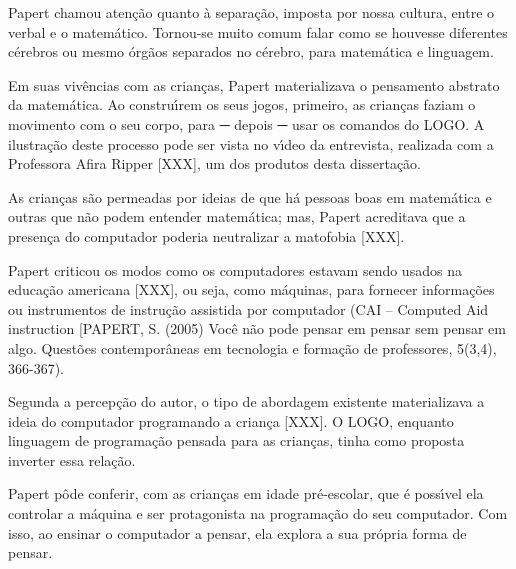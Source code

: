 \documentclass[
12pt,		%
openright,	%
twoside,  %
a4paper,			%
chapter=TITLE,		%
english,			%
french,				%
spanish,			%
brazil				%
]{USPSC-classe/USPSC_RedarTex}
\begin{document}
Papert chamou aten\c{c}\~ao quanto \`a separa\c{c}\~ao, imposta por nossa cultura, entre o verbal e o matem\'atico. Tornou-se muito comum falar como se houvesse diferentes c\'erebros ou mesmo \'org\~aos separados no c\'erebro, para matem\'atica e linguagem.








Em suas viv\^encias com as crian\c{c}as, Papert materializava o pensamento abstrato da matem\'atica. Ao constru\'{\i}rem os seus jogos, primeiro, as crian\c{c}as faziam o movimento com o seu corpo, para ─ depois  ─ usar os comandos do LOGO. A ilustra\c{c}\~ao deste processo pode ser vista no v\'{\i}deo  da entrevista, realizada com a Professora Afira Ripper [XXX],  um dos produtos desta disserta\c{c}\~ao.








As crian\c{c}as s\~ao permeadas por ideias de que h\'a pessoas boas em matem\'atica e outras que n\~ao podem entender matem\'atica; mas, Papert acreditava que a presen\c{c}a do computador poderia neutralizar a matofobia [XXX].








Papert criticou os modos como os computadores estavam sendo usados na educa\c{c}\~ao americana [XXX], ou seja, como m\'aquinas, para fornecer informa\c{c}\~oes ou instrumentos de instru\c{c}\~ao assistida por computador (CAI – Computed Aid instruction [PAPERT, S. (2005) Voc\^e n\~ao pode pensar em pensar sem pensar em algo. Quest\~oes contempor\^aneas em tecnologia e forma\c{c}\~ao de professores, 5(3,4), 366-367).








Segunda a percep\c{c}\~ao do autor, o tipo de abordagem existente materializava a ideia do computador programando a crian\c{c}a [XXX]. O LOGO, enquanto linguagem de programa\c{c}\~ao pensada para as crian\c{c}as, tinha como proposta inverter essa rela\c{c}\~ao.








Papert p\^ode conferir, com as crian\c{c}as em idade pr\'e-escolar, que \'e poss\'{\i}vel ela controlar a m\'aquina e ser protagonista na programa\c{c}\~ao do seu computador. Com isso, ao ensinar o computador a pensar, ela explora a sua pr\'opria forma de pensar.
\end{document}

